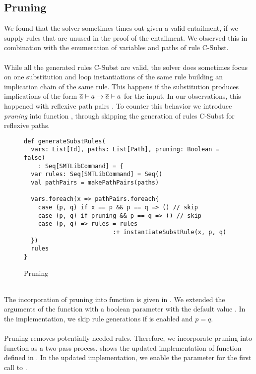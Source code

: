 \subsection{Pruning}
We found that the solver sometimes times out
given a valid entailment, if we supply rules
that are unused in the proof of the entailment.
We observed this in combination
with the enumeration of variables and paths of rule C-Subst.\\
\\
While all the generated rules C-Subst are valid,
the solver does sometimes focus on one substitution
and loop instantiations of the same rule
building an implication chain of the same rule.
This happens if the substitution produces implications
of the form $\overline{a} \vdash a \rightarrow \overline{a} \vdash a$
for the input.
In our observations, this happened with reflexive path pairs .
To counter this behavior we introduce \textit{pruning} into function ,
through skipping the generation of rules C-Subst for reflexive paths.
%
\begin{figure}[h]
\begin{lstlisting}
def generateSubstRules(
  vars: List[Id], paths: List[Path], pruning: Boolean = false)
    : Seq[SMTLibCommand] = {
  var rules: Seq[SMTLibCommand] = Seq()
  val pathPairs = makePathPairs(paths)

  vars.foreach(x => pathPairs.foreach{
    case (p, q) if x == p && p == q => () // skip
    case (p, q) if pruning && p == q => () // skip
    case (p, q) => rules = rules
                         :+ instantiateSubstRule(x, p, q)
  })
  rules
}
\end{lstlisting}
\caption{Pruning}
\label{fig:scala-pruning}
\end{figure}\\
The incorporation of pruning into function 
is given in .
We extended the arguments of the function with a
boolean parameter  with the default value .
In the implementation, we skip rule generations
if  is enabled and $p = q$.\\
\\
Pruning removes potentially needed rules.
Therefore, we incorporate pruning into function
 as a two-pass process.
 shows the updated
implementation of function  defined in .
In the updated implementation, we enable the  parameter
for the first call to .
